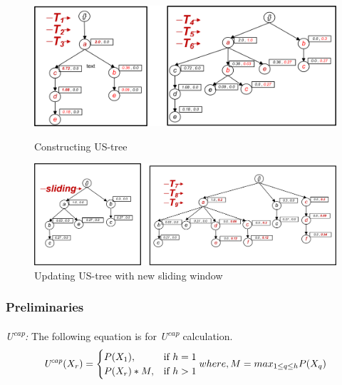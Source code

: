 \documentclass[conference]{IEEEtran}
\begin{document}
\begin{figure}[t]
    \begin{minipage}{0.5\linewidth}
        \centering
  		\includegraphics[width=.9\textwidth]{visio/sim_1_6_V2}
  		\caption{Constructing US-tree}
  		\label{figure:t1_6}
    \end{minipage}%
    \begin{minipage}{0.5\linewidth}
         \centering
  		 \includegraphics[width=.9\textwidth]{visio/sim_06_slide_789_V2}
  		 \caption{Updating US-tree with new sliding window}
  		 \label{figure:t7_9}
    \end{minipage}	
\end{figure}


\subsubsection{Preliminaries}
\emph{U\textsuperscript{cap}:}
    The following equation is for \emph{U\textsuperscript{cap}} calculation.
	{\footnotesize
    \begin{equation}\label{equation:cap}
	\text{\emph{U\textsuperscript{cap}}}(X_r) =\begin{cases}
				P(X_1), & \text{if $ h = 1$}\\
				P(X_r)*M, & \text{if $ h > 1$}
             
		\end{cases}
where,\\ M=max_{1\leq q\leq h}P(X_q)
\end{equation}}
\end{document}
